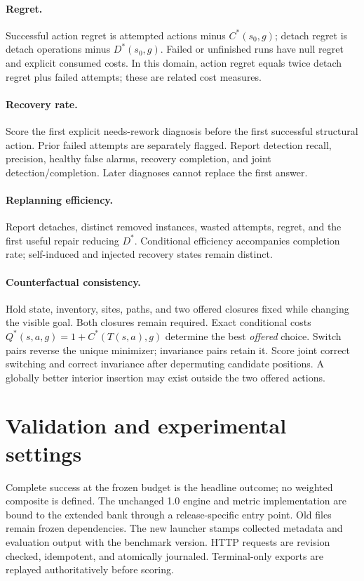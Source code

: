 \documentclass[10pt,twocolumn]{article}
\begin{document}
\paragraph{Regret.}
Successful action regret is attempted actions minus $C^*(s_0,g)$;
detach regret is detach operations minus $D^*(s_0,g)$.
Failed or unfinished runs have null regret and explicit consumed costs.
In this domain, action regret equals twice detach regret plus failed attempts;
these are related cost measures.

\paragraph{Recovery rate.}
Score the first explicit needs-rework diagnosis before the first successful
structural action. Prior failed attempts are separately flagged. Report
detection recall, precision, healthy false alarms, recovery completion, and
joint detection/completion. Later diagnoses cannot replace the first answer.

\paragraph{Replanning efficiency.}
Report detaches, distinct removed instances, wasted attempts, regret, and the
first useful repair reducing $D^*$. Conditional efficiency accompanies
completion rate; self-induced and injected recovery states remain distinct.

\paragraph{Counterfactual consistency.}
Hold state, inventory, sites, paths, and two offered closures fixed while
changing the visible goal. Both closures remain required. Exact conditional
costs $Q^*(s,a,g)=1+C^*(T(s,a),g)$ determine the best \emph{offered} choice.
Switch pairs reverse the unique minimizer; invariance pairs retain it.
Score joint correct switching and correct invariance after depermuting
candidate positions. A globally better interior insertion may exist outside
the two offered actions.

\section{Validation and experimental settings}
Complete success at the frozen budget is the headline outcome; no weighted
composite is defined. The unchanged 1.0 engine and metric implementation are
bound to the extended bank through a release-specific entry point. Old files
remain frozen dependencies. The new launcher stamps collected metadata and
evaluation output with the benchmark version. HTTP requests are revision
checked, idempotent, and atomically journaled. Terminal-only exports are replayed
authoritatively before scoring.
\end{document}
